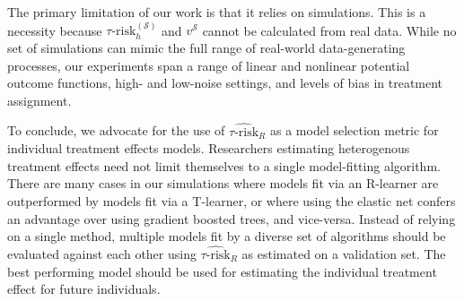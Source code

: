 The primary limitation of our work is that it relies on simulations. This is a necessity because $\tau\text{-risk}_{h}^{(\mathcal{S})}$ and $v^{\mathcal S}$ cannot be calculated from real data. While no set of simulations can mimic the full range of real-world data-generating processes, our experiments span a range of linear and nonlinear potential outcome functions, high- and low-noise settings, and levels of bias in treatment assignment. 

To conclude, we advocate for the use of $\widehat{\tau\text{-risk}}_{R}$ as a model selection metric for individual treatment effects models. Researchers estimating heterogenous treatment effects need not limit themselves to a single model-fitting algorithm. There are many cases in our simulations where models fit via an R-learner are outperformed by models fit via a T-learner, or where using the elastic net confers an advantage over using gradient boosted trees, and vice-versa. Instead of relying on a single method, multiple models fit by a diverse set of algorithms should be evaluated against each other using $\widehat{\tau\text{-risk}}_{R}$ as estimated on a validation set. The best performing model should be used for estimating the individual treatment effect for future individuals.


